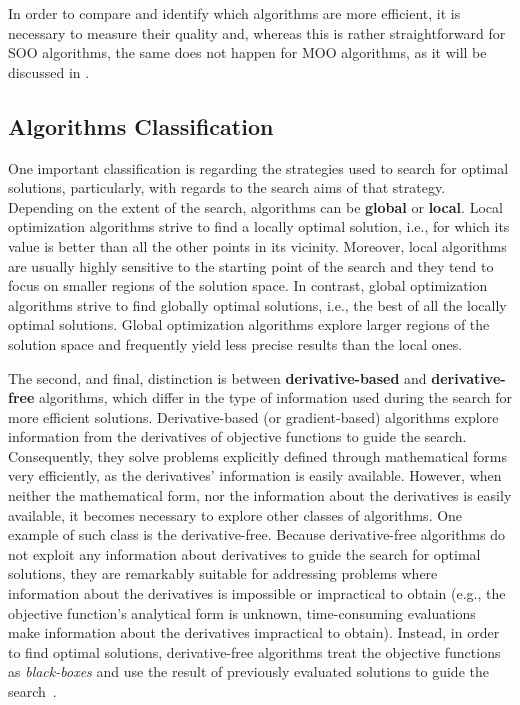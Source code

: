 	In order to compare and identify which algorithms are more efficient, it is necessary to measure their quality and, whereas this is rather straightforward for \ac{SOO} algorithms, the same does not happen for \ac{MOO} algorithms, as it will be discussed in .
	
	\subsection{Algorithms Classification}
	
	One important classification is regarding the strategies used to search for optimal solutions, particularly, with regards to the search aims of that strategy. Depending on the extent of the search, algorithms can be \textbf{global} or \textbf{local}. Local optimization algorithms strive to find a locally optimal solution, i.e., for which its value is better than all the other points in its vicinity. Moreover, local algorithms are usually highly sensitive to the starting point of the search and they tend to focus on smaller regions of the solution space. In contrast, global optimization algorithms strive to find globally optimal solutions, i.e., the best of all the locally optimal solutions. Global optimization algorithms explore larger regions of the solution space and frequently yield less precise results than the local ones.
		
	The second, and final, distinction is between \textbf{derivative-based} and \textbf{derivative-free} algorithms, which differ in the type of information used during the search for more efficient solutions. Derivative-based (or gradient-based) algorithms explore information from the derivatives of objective functions to guide the search. Consequently, they solve problems explicitly defined through mathematical forms very efficiently, as the derivatives' information is easily available. However, when neither the mathematical form, nor the information about the derivatives is easily available, it becomes necessary to explore other classes of algorithms. One example of such class is the derivative-free. Because derivative-free algorithms do not exploit any information about derivatives to guide the search for optimal solutions, they are remarkably suitable for addressing problems where information about the derivatives is impossible or impractical to obtain (e.g., the objective function's analytical form is unknown, time-consuming evaluations make information about the derivatives impractical to obtain). Instead, in order to find optimal solutions, derivative-free algorithms treat the objective functions as \textit{black-boxes} and use the result of previously evaluated solutions to guide the search~\cite{Rios2013}.
	
